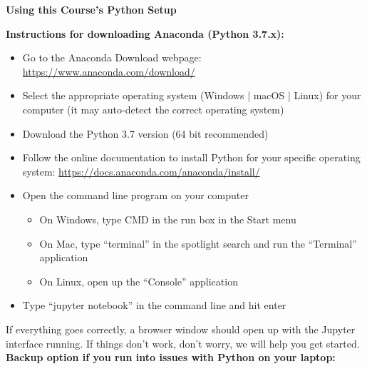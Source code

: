 \documentclass[oneside,letterpaper,11pt]{exam}
\begin{document}
\begin{center}
	\vspace{5pt}
	\textbf{Using this Course's Python Setup}
	\vspace{5pt}
\end{center}


{\noindent \textbf{Instructions for downloading Anaconda (Python 3.7.x):}}\\[-5pt]
\begin{itemize}
\item[1.] Go to the Anaconda Download webpage: \url{https://www.anaconda.com/download/} \\[-15pt]
\item[2.] Select the appropriate operating system (Windows | macOS | Linux) for your
computer (it may auto-detect the correct operating system) \\[-15pt]
\item[3.] Download the Python 3.7 version (64 bit recommended) \\[-15pt]
\item[4.] Follow the online documentation to install Python for your specific operating
system: \url{https://docs.anaconda.com/anaconda/install/} \\[8pt]
\item[5.] Open the command line program on your computer 
	\begin{itemize}
	\item[-] On Windows, type CMD in the run box in the Start menu \\[-15pt]
	\item[-] On Mac, type ``terminal'' in the spotlight search and run the ``Terminal''
application \\[-15pt]
	\item[-] On Linux, open up the ``Console'' application\\[-15pt]
	\end{itemize}
\item[6.] Type ``jupyter notebook'' in the command line and hit enter
\end{itemize}

{\noindent If everything goes correctly, a browser window should open up with the Jupyter interface running. If things don't work, don't worry, we will help you get started.}\\

{\noindent \textbf{Backup option if you run into issues with Python on your laptop:}}\\[-5pt]
\end{document}
